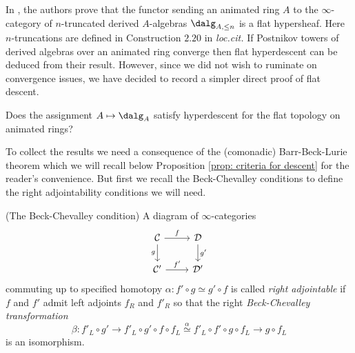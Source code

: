 \documentclass[10pt,reqno]{amsart}
\numberwithin{equation}{section}
\newcommand{\cD}{{\mathcal{D}}}
\newcommand{\cC}{\mathcal{C}}
\begin{document}
\begin{remark}
    In \cite[Corollary 2.19]{MM24}, the authors prove that the functor sending an animated ring $A$ to the $\infty$-category of $n$-truncated derived $A$-algebras $\dalg_{A,\leq n}$ is a flat hypersheaf. Here $n$-truncations are defined in Construction $2.20$ in \emph{loc.cit.}
    If Postnikov towers of derived algebras over an animated ring converge then flat hyperdescent can be deduced from their result. However, since we did not wish to ruminate on convergence issues, we have decided to record a simpler direct proof of flat descent.
\end{remark}

\begin{question}
    Does the assignment $A\mapsto \dalg_A$ satisfy hyperdescent for the flat topology on animated rings?
\end{question}

To collect the results we need a consequence of the (comonadic) Barr-Beck-Lurie theorem \cite[Theorem 4.7.5.2]{HA} which we will recall below Proposition \ref{prop: criteria for descent} for the reader's convenience. But first we recall the Beck-Chevalley conditions to define the right adjointability conditions we will need. 

\begin{definition}\label{beck-chevalley}(The Beck-Chevalley condition)
A diagram of $\infty$-categories $$
\begin{tikzcd}
\cC \arrow[r, "f"] \arrow[d, "g"'] & \cD \arrow[d, "g'"] \\
\cC' \arrow[r, "f'"]               & \cD'               
\end{tikzcd}$$ commuting up to specified homotopy $\alpha\colon f'\circ g\simeq g'\circ f$ is called \emph{right adjointable} if $f$ and $f'$ admit left adjoints $f_R$ and $f'_R$ so that the right \emph{Beck-Chevalley transformation} $$\beta\colon f'_L\circ g'\to f'_L\circ g'\circ f\circ f_L\mathrel{\overset{\alpha}{\simeq}} f'_L\circ f'\circ g\circ f_L\to g\circ f_L$$ is an isomorphism.
\end{definition}
\end{document}
